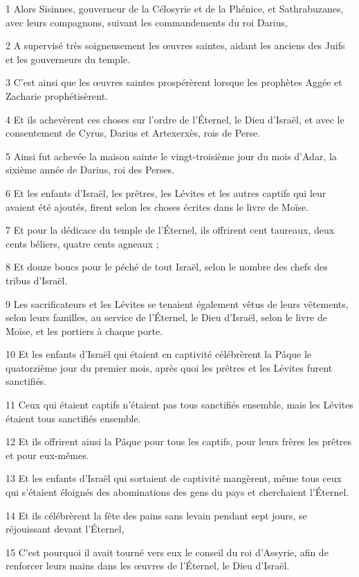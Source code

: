 \par 1 Alors Sisinnes, gouverneur de la Célosyrie et de la Phénice, et Sathrabuzanes, avec leurs compagnons, suivant les commandements du roi Darius,
\par 2 A supervisé très soigneusement les œuvres saintes, aidant les anciens des Juifs et les gouverneurs du temple.
\par 3 C'est ainsi que les œuvres saintes prospérèrent lorsque les prophètes Aggée et Zacharie prophétisèrent.
\par 4 Et ils achevèrent ces choses sur l'ordre de l'Éternel, le Dieu d'Israël, et avec le consentement de Cyrus, Darius et Artexerxès, rois de Perse.
\par 5 Ainsi fut achevée la maison sainte le vingt-troisième jour du mois d'Adar, la sixième année de Darius, roi des Perses.
\par 6 Et les enfants d'Israël, les prêtres, les Lévites et les autres captifs qui leur avaient été ajoutés, firent selon les choses écrites dans le livre de Moïse.
\par 7 Et pour la dédicace du temple de l'Éternel, ils offrirent cent taureaux, deux cents béliers, quatre cents agneaux ;
\par 8 Et douze boucs pour le péché de tout Israël, selon le nombre des chefs des tribus d'Israël.
\par 9 Les sacrificateurs et les Lévites se tenaient également vêtus de leurs vêtements, selon leurs familles, au service de l'Éternel, le Dieu d'Israël, selon le livre de Moïse, et les portiers à chaque porte.
\par 10 Et les enfants d'Israël qui étaient en captivité célébrèrent la Pâque le quatorzième jour du premier mois, après quoi les prêtres et les Lévites furent sanctifiés.
\par 11 Ceux qui étaient captifs n'étaient pas tous sanctifiés ensemble, mais les Lévites étaient tous sanctifiés ensemble.
\par 12 Et ils offrirent ainsi la Pâque pour tous les captifs, pour leurs frères les prêtres et pour eux-mêmes.
\par 13 Et les enfants d'Israël qui sortaient de captivité mangèrent, même tous ceux qui s'étaient éloignés des abominations des gens du pays et cherchaient l'Éternel.
\par 14 Et ils célébrèrent la fête des pains sans levain pendant sept jours, se réjouissant devant l'Éternel,
\par 15 C'est pourquoi il avait tourné vers eux le conseil du roi d'Assyrie, afin de renforcer leurs mains dans les œuvres de l'Éternel, le Dieu d'Israël.

